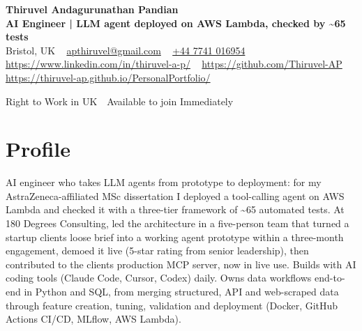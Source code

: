 \documentclass[a4paper,11pt]{article}
\newcommand{\num}[1]{\textbf{#1}}   %
\begin{document}
\begin{center}
  {\LARGE\bfseries Thiruvel Andagurunathan Pandian} \\[3pt]
  {\color{headernavy}\small\textbf{AI Engineer | LLM agent deployed on AWS Lambda, checked by \num{\textasciitilde{}65} tests}} \\[3pt]
  {\small
  Bristol, UK\nobreak\ \,\textbar\, \href{mailto:apthiruvel@gmail.com}{apthiruvel@gmail.com}\nobreak\ \,\textbar\, \href{tel:+447741016954}{+44 7741 016954}\nobreak\ \,\textbar\, \href{https://www.linkedin.com/in/thiruvel-a-p/}{https://www.linkedin.com/in/thiruvel-a-p/}\nobreak\ \,\textbar\, \href{https://github.com/Thiruvel-AP}{https://github.com/Thiruvel-AP}\nobreak\ \,\textbar\, \href{https://thiruvel-ap.github.io/PersonalPortfolio/}{https://thiruvel-ap.github.io/PersonalPortfolio/}}\par\vspace{4pt}
  \noindent{} Right to Work in UK \,\textbar\, Available to join Immediately
\end{center}

\section{Profile}
AI engineer who takes LLM agents from prototype to deployment: for my AstraZeneca-affiliated MSc dissertation I deployed a tool-calling agent on AWS Lambda and checked it with a three-tier framework of \textasciitilde{}65 automated tests. At 180 Degrees Consulting, led the architecture in a five-person team that turned a startup client\textquotesingle{}s loose brief into a working agent prototype within a three-month engagement, demoed it live (5-star rating from senior leadership), then contributed to the client\textquotesingle{}s production MCP server, now in live use. Builds with AI coding tools (Claude Code, Cursor, Codex) daily. Owns data workflows end-to-end in Python and SQL, from merging structured, API and web-scraped data through feature creation, tuning, validation and deployment (Docker, GitHub Actions CI/CD, MLflow, AWS Lambda).
\end{document}
